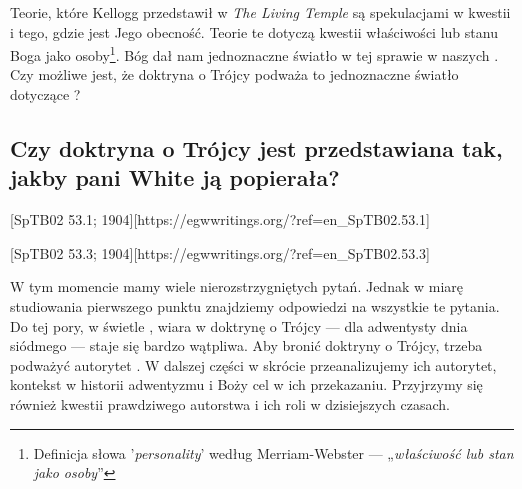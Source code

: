 Teorie, które Kellogg przedstawił w \textit{The Living Temple} są spekulacjami w kwestii  i tego, gdzie jest Jego obecność. Teorie te dotyczą kwestii właściwości lub stanu Boga jako osoby\footnote{Definicja słowa '\textit{personality}' według Merriam-Webster — „\textit{właściwość lub stan jako osoby}”}. Bóg dał nam jednoznaczne światło w tej sprawie w naszych . Czy możliwe jest, że doktryna o Trójcy podważa to jednoznaczne światło dotyczące ?

\subsection*{Czy doktryna o Trójcy jest przedstawiana tak, jakby pani White ją popierała?}

[SpTB02 53.1; 1904][https://egwwritings.org/?ref=en\_SpTB02.53.1]

[SpTB02 53.3; 1904][https://egwwritings.org/?ref=en\_SpTB02.53.3]

W tym momencie mamy wiele nierozstrzygniętych pytań. Jednak w miarę studiowania pierwszego punktu  znajdziemy odpowiedzi na wszystkie te pytania. Do tej pory, w świetle , wiara w doktrynę o Trójcy — dla adwentysty dnia siódmego — staje się bardzo wątpliwa. Aby bronić doktryny o Trójcy, trzeba podważyć autorytet . W dalszej części w skrócie przeanalizujemy ich autorytet, kontekst w historii adwentyzmu i Boży cel w ich przekazaniu. Przyjrzymy się również kwestii prawdziwego autorstwa  i ich roli w dzisiejszych czasach.



